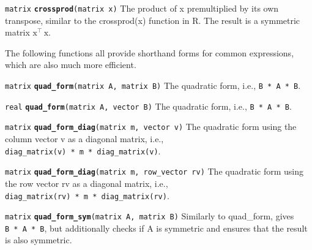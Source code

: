 \documentclass[
  10pt,
]{book}
\begin{document}

\texttt{matrix} \textbf{\texttt{crossprod}}\texttt{(matrix\ x)}\newline
The product of x premultiplied by its own transpose, similar to the
crossprod(x) function in R. The result is a symmetric matrix
\(\text{x}^{\top}\,\text{x}\).

The following functions all provide shorthand forms for common
expressions, which are also much more efficient.


\texttt{matrix} \textbf{\texttt{quad\_form}}\texttt{(matrix\ A,\ matrix\ B)}\newline
The quadratic form, i.e., \texttt{B\textquotesingle{}\ *\ A\ *\ B}.


\texttt{real} \textbf{\texttt{quad\_form}}\texttt{(matrix\ A,\ vector\ B)}\newline
The quadratic form, i.e., \texttt{B\textquotesingle{}\ *\ A\ *\ B}.


\texttt{matrix} \textbf{\texttt{quad\_form\_diag}}\texttt{(matrix\ m,\ vector\ v)}\newline
The quadratic form using the column vector v as a diagonal matrix,
i.e., \texttt{diag\_matrix(v)\ *\ m\ *\ diag\_matrix(v)}.


\texttt{matrix} \textbf{\texttt{quad\_form\_diag}}\texttt{(matrix\ m,\ row\_vector\ rv)}\newline
The quadratic form using the row vector rv as a diagonal matrix, i.e.,
\texttt{diag\_matrix(rv)\ *\ m\ *\ diag\_matrix(rv)}.


\texttt{matrix} \textbf{\texttt{quad\_form\_sym}}\texttt{(matrix\ A,\ matrix\ B)}\newline
Similarly to quad\_form, gives \texttt{B\textquotesingle{}\ *\ A\ *\ B}, but additionally checks if
A is symmetric and ensures that the result is also symmetric.
\end{document}
